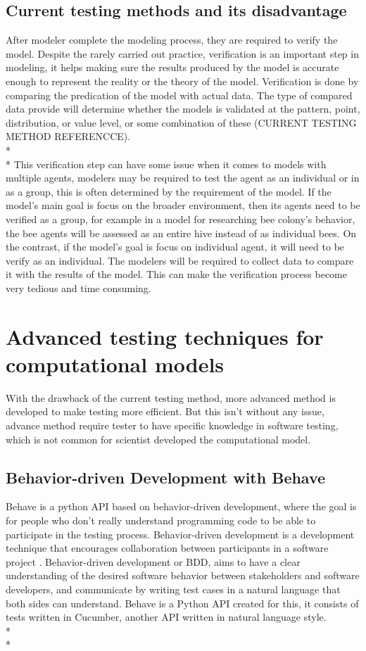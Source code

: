 \subsection{Current testing methods and its disadvantage}
After modeler complete the modeling process, they are required to verify the model. 
Despite the rarely carried out practice, verification is an important step in modeling, it helps making sure the results produced by the model is accurate enough to represent the reality or the theory of the model. Verification is done by comparing the predication of the model with actual data. The type of compared data provide will determine whether the models is validated at the pattern, point, distribution, or value level, or some combination of these (CURRENT TESTING METHOD REFERENCCE). \\*\\*
This verification step can have some issue when it comes to models with multiple agents, modelers may be required to test the agent as an individual or in as a group, this is often determined by the requirement of the model. If the model’s main goal is focus on the broader environment, then its agents need to be verified as a group, for example in a model for researching bee colony’s behavior, the bee agents will be assessed as an entire hive instead of as individual bees. On the contrast, if the model’s goal is focus on individual agent, it will need to be verify as an individual.
The modelers will be required to collect data to compare it with the results of the model. This can make the verification process become very tedious and time consuming. 

\section{Advanced testing techniques for computational models}
With the drawback of the current testing method, more advanced method is developed to make testing more efficient. But this isn’t without any issue, advance method require tester to have specific knowledge in software testing, which is not common for scientist developed the computational model.

\subsection{Behavior-driven Development with Behave}
Behave is a python API based on behavior-driven development, where the goal is for people who don’t really understand programming code to be able to participate in the testing process. Behavior-driven development is a development technique that encourages collaboration between participants in a software project \cite{Reference8}. Behavior-driven development or BDD, aims to have a clear understanding of the desired software behavior between stakeholders and software developers, and communicate by writing test cases in a natural language that both sides can understand. Behave is a Python API created for this, it consists of tests written in Cucumber, another API written in natural language style. \\*\\*

